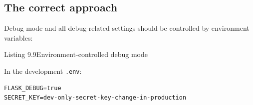 \subsection*{The correct approach}\label{09-configuration-coupling:the-correct-approach-2}

Debug mode and all debug-related settings should be controlled by environment variables:

\begin{codeboxcap}[short]{\textcolor{accent}{Listing 9.9}\enspace Environment-controlled debug mode}

\begin{Shaded}
\begin{Highlighting}[]

\OperatorTok{=}\NormalTok{, }\OperatorTok{==} 

\NormalTok{app.config[}\NormalTok{] }\OperatorTok{=}
\NormalTok{app.config[}\NormalTok{] }\OperatorTok{=}\NormalTok{ os.environ[}\NormalTok{]}
\NormalTok{app.config[}\NormalTok{] }\OperatorTok{=} 

  \OperatorTok{==} \NormalTok{:}
\OperatorTok{=}\OperatorTok{=}\OperatorTok{=}\NormalTok{, }\NormalTok{)))}
\end{Highlighting}
\end{Shaded}

\end{codeboxcap}

\noindent{}In the development \texttt{.env}:

\begin{outputbox}[short]
\begin{Verbatim}[fontsize=\codesize, breaklines, breakanywhere, breaksymbolleft={\tiny\textcolor{muted}{$\hookrightarrow$}}]
FLASK_DEBUG=true
SECRET_KEY=dev-only-secret-key-change-in-production
\end{Verbatim}
\end{outputbox}

